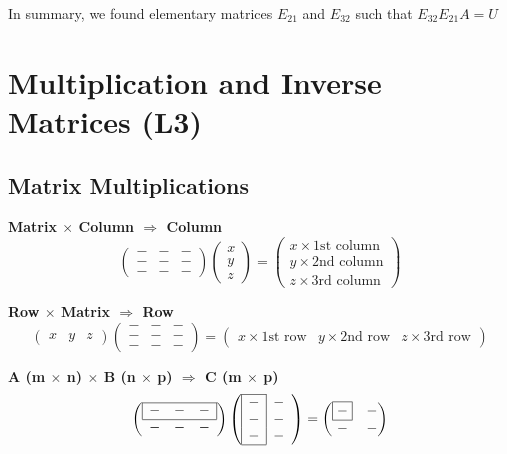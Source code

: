 \documentclass[12pt]{article}
\begin{document}
In summary, we found elementary matrices $E_{21}$ and $E_{32}$ such that $E_{32}E_{21}A = U$

\newpage

\section{Multiplication and Inverse Matrices (L3)}

\subsection{Matrix Multiplications}
\textbf{Matrix $\times$ Column $\Rightarrow$ Column}
\[
\left(
    \begin{matrix}
        - & - & -\\ 
        - & - & -\\
        - & - & -
    \end{matrix}
\right)
\left(
    \begin{matrix}
        x\\ 
        y\\
        z
    \end{matrix}
\right)
=
\left(
    \begin{matrix}
        x \times \text{1st column}\\ 
        y \times \text{2nd column}\\
        z \times \text{3rd column}
    \end{matrix}
\right)
\]

\textbf{Row $\times$ Matrix $\Rightarrow$ Row}
\[
\left(
    \begin{matrix}
        x & y & z
    \end{matrix}
\right)
\left(
    \begin{matrix}
        - & - & -\\ 
        - & - & -\\
        - & - & -
    \end{matrix}
\right)
=
\left(
    \begin{matrix}
        x \times \text{1st row} & 
        y \times \text{2nd row} &
        z \times \text{3rd row}
    \end{matrix}
\right)
\]

\textbf{A (m $\times$ n) $\times$ B (n $\times$ p) $\Rightarrow$ C (m $\times$ p)}
\[
\left(
    \begin{array}{*{3}{c}}
    \cline{1-3}
    \multicolumn{1}{|c}{-} & - & \multicolumn{1}{c|}{-}\\
    \cline{1-3}
    - & - & -
    \end{array}
\right)
\left(
    \begin{array}{*{2}{c}}
    \cline{1-1}
    \multicolumn{1}{|c|}{-} & -\\
    \multicolumn{1}{|c|}{-} & -\\
    \multicolumn{1}{|c|}{-} & -\\
    \cline{1-1}
    \end{array}
\right)  
=
\left(
    \begin{matrix}
        \boxed{-} & -\\ 
        - & -
    \end{matrix}
\right)
\]
\end{document}
